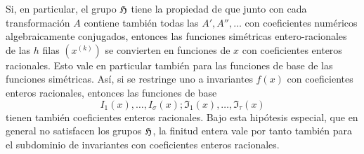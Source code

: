 Si, en particular, el grupo \(\mathfrak H\) tiene la propiedad de que junto con cada transformación \(A\) contiene también todas las \(A',A'',\ldots\) con coeficientes numéricos algebraicamente conjugados, entonces las funciones simétricas entero-racionales de las \(h\) filas \((x^{(k)})\) se convierten en funciones de \(x\) con coeficientes enteros racionales. Esto vale en particular también para las funciones de base de las funciones simétricas. Así, si se restringe uno a invariantes \(f(x)\) con coeficientes enteros racionales, entonces las funciones de base
\[
        I_1(x),\ldots,I_\sigma(x);\mathfrak I_1(x),\ldots,\mathfrak I_\tau(x)
\]
tienen también coeficientes enteros racionales. Bajo esta hipótesis especial, que en general no satisfacen los grupos \(\mathfrak H\), la finitud entera vale por tanto también para el subdominio de invariantes con coeficientes enteros racionales.
